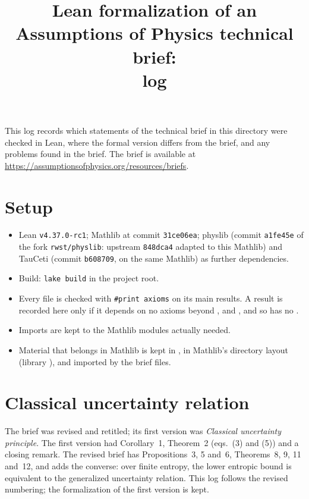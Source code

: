 \documentclass[11pt]{article}
\title{Lean formalization of an Assumptions of Physics technical brief:\\ log}
\author{}
\date{}
\begin{document}
\maketitle

\noindent
This log records which statements of the technical brief in this directory were checked in Lean,
where the formal version differs from the brief, and any problems found in the brief.
The brief is available at \url{https://assumptionsofphysics.org/resources/briefs}.

\section*{Setup}

\begin{itemize}
\item Lean \texttt{v4.37.0-rc1}; Mathlib at commit \texttt{31ce06ea}; physlib (commit \texttt{a1fe45e}
  of the fork \texttt{rwst/physlib}: upstream \texttt{848dca4} adapted to this Mathlib) and
  TauCeti (commit \texttt{b608709}, on the same Mathlib) as further dependencies.
\item Build: \texttt{lake build} in the project root.
\item Every file is checked with \texttt{\#print axioms} on its main results. A result is
  recorded here only if it depends on no axioms beyond ,
   and , and so has no .
\item Imports are kept to the Mathlib modules actually needed.
\item Material that belongs in Mathlib is kept in , in Mathlib's directory
  layout (library ), and imported by the brief files.
\end{itemize}



\section{Classical uncertainty relation}

The brief was revised and retitled; its first version was \emph{Classical uncertainty
principle}. The first version had Corollary~1, Theorem~2 (eqs.~(3) and (5)) and a closing remark.
The revised brief has Propositions~3, 5 and~6, Theorems~8, 9, 11 and~12, and adds the converse:
over finite entropy, the lower entropic bound is equivalent to the generalized uncertainty
relation. This log follows the revised numbering; the formalization of the first version is kept.
\end{document}
